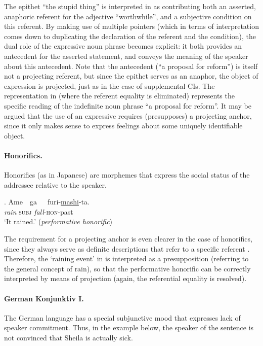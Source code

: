 \noindent The epithet ``the stupid thing'' is interpreted in \Last[a] as
contributing both an asserted, anaphoric referent for the adjective
``worthwhile'', and a subjective condition on this referent. By making use
of multiple pointers (which in terms of interpretation comes down to
duplicating the declaration of the referent and the condition), the  dual
role of the expressive noun phrase becomes explicit: it both provides an
antecedent for the asserted statement, and conveys the meaning of the
speaker about this antecedent. Note that the antecedent (``a proposal for
reform'') is itself not a projecting referent, but since the epithet serves
as an anaphor, the object of expression is projected, just as in the case of
supplemental CIs. 
The representation in \Last[b] (where the referent equality is eliminated)
represents the specific reading of the indefinite noun phrase ``a proposal
for reform''. It may be argued that the use of an expressive requires
(presupposes) a projecting anchor, since it only makes sense to express
feelings about some uniquely identifiable object. 

\paragraph{Honorifics.} Honorifics (as in Japanese) are morphemes that
express the social status of the addressee relative to the speaker.

\noindent\parbox[b]{\textwidth}{
\ex. Ame~~ga~~~furi-\underline{mashi}-ta.\\
\textit{rain} \textsc{subj} \textit{fall}-\textsc{hon}-past\\
`It rained.' (\textit{performative honorific})\\

}

\noindent The requirement for a projecting anchor is even clearer in the
case of honorifics, since they always serve as definite descriptions that
refer to a specific referent \citep[cf.][]{potts2004japanese}. Therefore,
the `raining event' in \Last is interpreted as a presupposition (referring
to the general concept of rain), so that the performative honorific can be
correctly interpreted by means of projection (again, the referential
equality is resolved).

\paragraph{German Konjunktiv I.} The German language has a special
subjunctive mood that expresses lack of speaker commitment. Thus, in the
example below, the speaker of the sentence is not convinced that Sheila is
actually sick.

